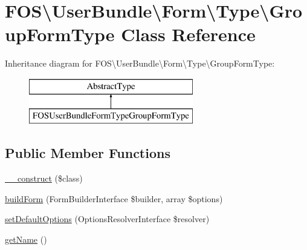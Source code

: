 \hypertarget{class_f_o_s_1_1_user_bundle_1_1_form_1_1_type_1_1_group_form_type}{\section{F\+O\+S\textbackslash{}User\+Bundle\textbackslash{}Form\textbackslash{}Type\textbackslash{}Group\+Form\+Type Class Reference}
\label{class_f_o_s_1_1_user_bundle_1_1_form_1_1_type_1_1_group_form_type}
}
Inheritance diagram for F\+O\+S\textbackslash{}User\+Bundle\textbackslash{}Form\textbackslash{}Type\textbackslash{}Group\+Form\+Type\+:\begin{figure}[H]
\begin{center}
\leavevmode
\includegraphics[height=2.000000cm]{class_f_o_s_1_1_user_bundle_1_1_form_1_1_type_1_1_group_form_type}
\end{center}
\end{figure}
\subsection*{Public Member Functions}
\begin{DoxyCompactItemize}
\item 
\hyperlink{class_f_o_s_1_1_user_bundle_1_1_form_1_1_type_1_1_group_form_type_ac15daac91e2ea1b1c1251b6a319b5bd1}{\+\_\+\+\_\+construct} (\$class)
\item 
\hyperlink{class_f_o_s_1_1_user_bundle_1_1_form_1_1_type_1_1_group_form_type_a7889c8e5b6f29659b7ac9973b819b916}{build\+Form} (Form\+Builder\+Interface \$builder, array \$options)
\item 
\hyperlink{class_f_o_s_1_1_user_bundle_1_1_form_1_1_type_1_1_group_form_type_ab37e2e0206fe577a31b3a52051eacbbd}{set\+Default\+Options} (Options\+Resolver\+Interface \$resolver)
\item 
\hyperlink{class_f_o_s_1_1_user_bundle_1_1_form_1_1_type_1_1_group_form_type_a58963f552c8a1f7028660efd3932bb5c}{get\+Name} ()
\end{DoxyCompactItemize}



